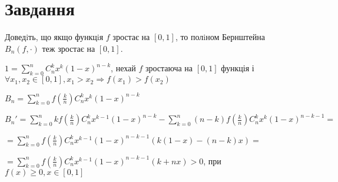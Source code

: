 
\chapter{Завдання \theHchapter}

\begin{tcolorbox}[title=Завдання]
    Доведiть, що якщо функцiя $f$ зростає на $[0, 1]$, то полiном 
    Бернштейна $B_n(f, \cdot)$ теж зростає на $[0, 1]$.
\end{tcolorbox}


$ 1 = \sum\limits_{k=0}^{n}C_n^kx^k(1 - x)^{n - k} $,
нехай $f$ зростаюча на $[0, 1]$ функція і $\forall x_1, x_2 \in [0, 1],
x_1 > x_2 \Rightarrow f(x_1) > f(x_2)$


$ B_n = \sum\limits_{k=0}^{n}f(\frac{k}{n})C_n^kx^k(1 - x)^{n - k} $


$ B_n' = \sum\limits_{k=0}^{n}kf(\frac{k}{n})C_n^kx^{k - 1}(1 - x)^{n - k}-
\sum\limits_{k=0}^{n}(n - k)f(\frac{k}{n})C_n^kx^k(1 - x)^{n - k - 1}=$


$=\sum\limits_{k=0}^{n}f(\frac{k}{n})C_n^kx^{k - 1}(1 - x)^{n - k - 1}
    (k(1 - x) - (n - k)x) =$


$=\sum\limits_{k=0}^{n}f(\frac{k}{n})C_n^kx^{k - 1}(1 - x)^{n - k - 1}
    (k + nx) > 0$, при $f(x) \geq 0, x \in [0, 1]$
